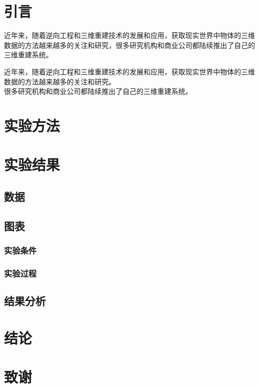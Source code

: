 \documentclass{article}
\begin{document}
	\tableofcontents%
	
	\section{引言}
	近年来，随着逆向工程和三维重建技术的发展和应用，获取现实世界中物体的三维数据的方法越来越多的关注和研究，很多研究机构和商业公司都陆续推出了自己的三维重建系统。
	
	近年来，随着逆向工程和三维重建技术的发展和应用，获取现实世界中物体的三维数据的方法越来越多的关注和研究。\\很多研究机构和商业公司都陆续推出了自己的三维重建系统。%
	
	\section{实验方法}
	\section{实验结果}
	\subsection{数据}
	\subsection{图表}
	\subsubsection{实验条件}
	\subsubsection{实验过程}
	\subsection{结果分析}
	\section{结论}
	\section{致谢}
	
\end{document}
